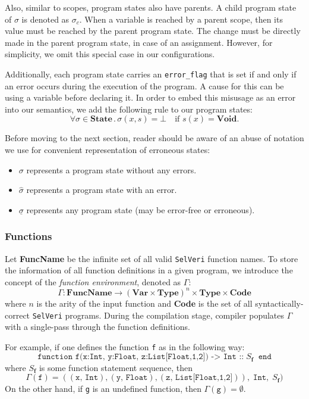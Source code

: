 \documentclass{article}
\begin{document}
Also, similar to scopes, program states also have parents. A child program state of $\sigma$ is denoted as $\sigma_c$. When a variable is reached by a parent scope, then its value must be reached by the parent program state. The change must be directly made in the parent program state, in case of an assignment. However, for simplicity, we omit this special case in our configurations.

Additionally, each program state carries an \texttt{error\_flag} that is set if and only if an error occurs during the execution of the program. A cause for this can be using a variable before declaring it. In order to embed this misusage as an error into our semantics, we add the following rule to our program states:
\[
\forall \sigma \in \textbf{State} \, . \, \sigma(x,s) = \bot \quad \text{if } s(x) = \textbf{Void}.
\]

Before moving to the next section, reader should be aware of an abuse of notation we use for convenient representation of erroneous states:
\begin{itemize}
    \item $\sigma$ represents a program state without any errors.
    \item $\hat{\sigma}$ represents a program state with an error.
    \item $\underline{\sigma}$ represents any program state (may be error-free or erroneous).
\end{itemize}

\newpage
\subsubsection{Functions}

Let \textbf{FuncName} be the infinite set of all valid \texttt{SelVeri} function names. To store the information of all function definitions in a given program, we introduce the concept of the \textit{function environment}, denoted as $\Gamma$:
\[
\Gamma : \textbf{FuncName} \rightarrow (\textbf{Var} \times \textbf{Type})^n \times \textbf{Type} \times \textbf{Code}
\] where $n$ is the arity of the input function and \textbf{Code} is the set of all syntactically-correct \texttt{SelVeri} programs. During the compilation stage, compiler populates $\Gamma$ with a single-pass through the function definitions.

For example, if one defines the function \texttt{f} as in the following way:
\[
\texttt{function f(x:Int, y:Float, z:List[Float,1,2]) -> Int ::}\; S_\textbf{f} \;\;\texttt{end}
\]
where $S_\textbf{f}$ is some function statement sequence, then 
\[
\Gamma(\texttt{f}) = ((\texttt{x},\, \texttt{Int}), (\texttt{y},\, \texttt{Float}),(\texttt{z},\, \texttt{List[Float,1,2]})),\; \texttt{Int},\; S_\textbf{f})
\]
On the other hand, if \texttt{g} is an undefined function, then $\Gamma(\texttt{g}) = \emptyset$.
\end{document}
